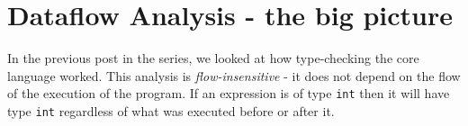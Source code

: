 %

\hypertarget{dataflow-analysis---the-big-picture}{%
\section{\texorpdfstring{\protect\hyperlink{dataflow-analysis---the-big-picture}{}Dataflow
Analysis - the big
picture}{Dataflow Analysis - the big picture}}\label{dataflow-analysis---the-big-picture}}

In the previous post in the series, we looked at how type-checking the
core language worked. This analysis is \emph{flow-insensitive} - it does
not depend on the flow of the execution of the program. If an expression
is of type \texttt{int} then it will have type \texttt{int} regardless
of what was executed before or after it.

